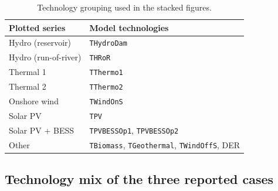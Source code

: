 \documentclass[11pt]{article}
\begin{document}
\begin{table}[htb]
  \centering
  \small
  \begin{tabular}{@{}ll@{}}
    \toprule
    Plotted series & Model technologies \\
    \midrule
    Hydro (reservoir)       & \texttt{THydroDam} \\
    Hydro (run-of-river)    & \texttt{THRoR} \\
    Thermal 1               & \texttt{TThermo1} \\
    Thermal 2               & \texttt{TThermo2} \\
    Onshore wind            & \texttt{TWindOnS} \\
    Solar PV                & \texttt{TPV} \\
    Solar PV + BESS         & \texttt{TPVBESSOp1}, \texttt{TPVBESSOp2} \\
    Other                   & \texttt{TBiomass}, \texttt{TGeothermal}, \texttt{TWindOffS}, DER \\
    \bottomrule
  \end{tabular}
  \caption{Technology grouping used in the stacked figures.}
  \label{tab:sm:groups}
\end{table}

\subsection{Technology mix of the three reported cases}
\end{document}
